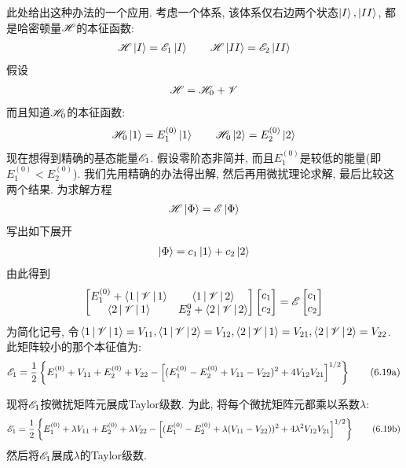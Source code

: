 此处给出这种办法的一个应用. 考虑一个体系, 该体系仅右边两个状态$\Ket{I},\Ket{II}$, 都是哈密顿量$\mathscr{H}$的本征函数:
\begin{align*}
\mathscr{H}\Ket{I} = \mathscr{E}_1\Ket{I} \qquad \mathscr{H}\Ket{II} = \mathscr{E}_2\Ket{II}
\end{align*}
假设
\begin{align*}
\mathscr{H}=\mathscr{H}_0+\mathscr{V}
\end{align*}
而且知道$\mathscr{H}_0$的本征函数:
\begin{align*}
\mathscr{H}_0\Ket{1} = E_1^{(0)}\Ket{1}\qquad \mathscr{H}_0\Ket{2} = E_2^{(0)}\Ket{2}
\end{align*}
现在想得到精确的基态能量$\mathscr{E}_1$. 假设零阶态非简并, 而且$E_1^{(0)}$是较低的能量(即$E_1^{(0)} < E_2^{(0)}$). 我们先用精确的办法得出解, 然后再用微扰理论求解, 最后比较这两个结果. 为求解方程
\begin{align}
\mathscr{H}\Ket{\Phi}=\mathscr{E}\Ket{\Phi}
\end{align}
写出如下展开
\begin{align}
\Ket{\Phi} = c_1\Ket{1} + c_2\Ket{2}
\end{align}
由此得到
\begin{align}
\begin{bmatrix}
E_1^{(0)} + \Braket{1|\mathscr{V}|1} & \Braket{1|\mathscr{V}|2}\\
\Braket{2|\mathscr{V}|1}			& E_2^{0} + \Braket{2|\mathscr{V}|2}
\end{bmatrix}
\begin{bmatrix}
c_1\\c_2
\end{bmatrix}
=
\mathscr{E}\begin{bmatrix}
c_1\\c_2
\end{bmatrix}
\end{align}
为简化记号, 令$\Braket{1|\mathscr{V}|1}=V_{11},\Braket{1|\mathscr{V}|2}=V_{12},\Braket{2|\mathscr{V}|1}=V_{21},\Braket{2|\mathscr{V}|2}=V_{22}$. 此矩阵较小的那个本征值为:
\begin{align}
\es_1 = \frac{1}{2} \left\{  E_1^{(0)} + V_{11} + E_2^{(0)} + V_{22} - \left[ (E_1^{(0)} -E_{2}^{(0)} + V_{11} - V_{22})^2 +4V_{12}V_{21} \right]^{1/2}      \right\}\tag{6.19a}
\addtocounter{equation}{1}
\end{align}

现将$\mathscr{E}_1$按微扰矩阵元展成Taylor级数.  为此, 将每个微扰矩阵元都乘以系数$\lambda$:
\begin{align}
\mathscr{E}_1 = \frac{1}{2} \left\{  E_1^{(0)} + \lambda V_{11} + E_2^{(0)} + \lambda V_{22} - \left[ (E_1^{(0)} -E_{2}^{(0)} + \lambda(V_{11} - V_{22}))^2 +4\lambda^2 V_{12}V_{21} \right]^{1/2}      \right\}\tag{6.19b}
\end{align}
然后将$\mathscr{E}_1$展成$\lambda$的Taylor级数.

